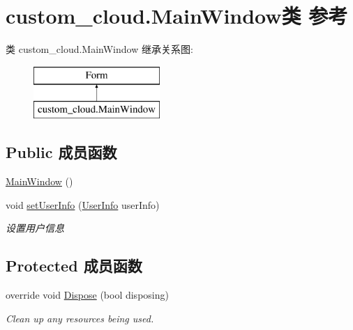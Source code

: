 \hypertarget{classcustom__cloud_1_1_main_window}{}\section{custom\+\_\+cloud.\+Main\+Window类 参考}
\label{classcustom__cloud_1_1_main_window}
类 custom\+\_\+cloud.\+Main\+Window 继承关系图\+:\begin{figure}[H]
\begin{center}
\leavevmode
\includegraphics[height=2.000000cm]{classcustom__cloud_1_1_main_window}
\end{center}
\end{figure}
\subsection*{Public 成员函数}
\begin{DoxyCompactItemize}
\item 
\hyperlink{classcustom__cloud_1_1_main_window_af2546947b8974a59b67f942c3f49d857}{Main\+Window} ()
\item 
void \hyperlink{classcustom__cloud_1_1_main_window_af065631df1b4fac9afa0b769cbcfbe4c}{set\+User\+Info} (\hyperlink{classcustom__cloud_1_1_user_info}{User\+Info} user\+Info)
\begin{DoxyCompactList}\small\item\em 设置用户信息 \end{DoxyCompactList}\end{DoxyCompactItemize}
\subsection*{Protected 成员函数}
\begin{DoxyCompactItemize}
\item 
override void \hyperlink{classcustom__cloud_1_1_main_window_a0118da6927fd70450c2a667903dc2285}{Dispose} (bool disposing)
\begin{DoxyCompactList}\small\item\em Clean up any resources being used. \end{DoxyCompactList}\end{DoxyCompactItemize}


